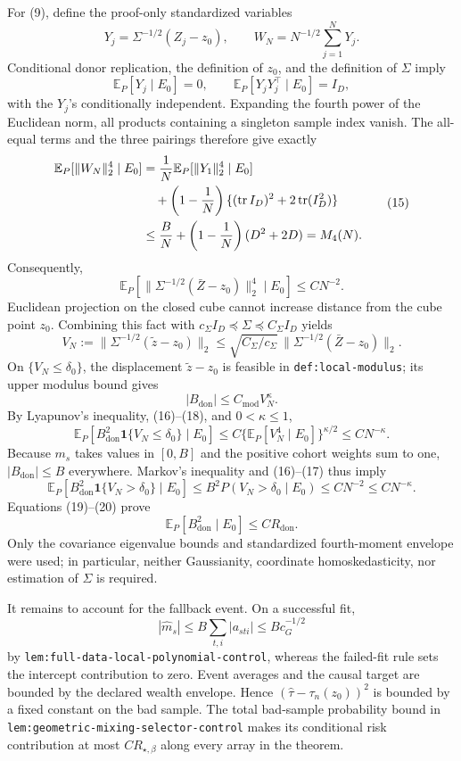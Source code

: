 For (9), define the proof-only standardized variables
\[
Y_j=\Sigma^{-1/2}(Z_j-z_0),
\qquad
W_N=N^{-1/2}\sum_{j=1}^{N}Y_j.
\]
Conditional donor replication, the definition of \(z_0\), and the definition of \(\Sigma\) imply
\[
\mathbb E_P[Y_j\mid E_0]=0,
\qquad
\mathbb E_P[Y_jY_j^\top\mid E_0]=I_D,
\]
with the \(Y_j\)'s conditionally independent.  Expanding the fourth power of the Euclidean norm, all products containing a singleton sample index vanish.  The all-equal terms and the three pairings therefore give exactly
\[
\begin{aligned}
\mathbb E_P[\|W_N\|_2^4\mid E_0]
&={1\over N}\mathbb E_P[\|Y_1\|_2^4\mid E_0]\\
&\quad+\left(1-{1\over N}\right)
\{(\operatorname{tr}I_D)^2+2\operatorname{tr}(I_D^2)\}\\
&\le {B\over N}+\left(1-{1\over N}\right)(D^2+2D)
=M_4(N).
\end{aligned}
\tag{15}
\]
Consequently,
\[
\mathbb E_P\!\left[
\|\Sigma^{-1/2}(\bar Z-z_0)\|_2^4\mid E_0
\right]
\le C N^{-2}.
\tag{16}
\]
Euclidean projection on the closed cube cannot increase distance from the cube point \(z_0\).  Combining this fact with
\(c_\Sigma I_D\preceq\Sigma\preceq C_\Sigma I_D\) yields
\[
V_N:=\|\Sigma^{-1/2}(\widetilde z-z_0)\|_2
\le \sqrt{C_\Sigma/c_\Sigma}\,
\|\Sigma^{-1/2}(\bar Z-z_0)\|_2.
\tag{17}
\]
On \(\{V_N\le\delta_0\}\), the displacement \(\widetilde z-z_0\) is feasible in \texttt{def:local-modulus}; its upper modulus bound gives
\[
|B_{\mathrm{don}}|\le C_{\mathrm{mod}}V_N^\kappa.
\tag{18}
\]
By Lyapunov's inequality, (16)--(18), and \(0<\kappa\le1\),
\[
\mathbb E_P[B_{\mathrm{don}}^2
 \mathbf1\{V_N\le\delta_0\}\mid E_0]
\le C\{\mathbb E_P[V_N^4\mid E_0]\}^{\kappa/2}
\le C N^{-\kappa}.
\tag{19}
\]
Because \(m_s\) takes values in \([0,B]\) and the positive cohort weights sum to one, \(|B_{\mathrm{don}}|\le B\) everywhere.  Markov's inequality and (16)--(17) thus imply
\[
\mathbb E_P[B_{\mathrm{don}}^2
 \mathbf1\{V_N>\delta_0\}\mid E_0]
\le B^2P(V_N>\delta_0\mid E_0)
\le C N^{-2}
\le C N^{-\kappa}.
\tag{20}
\]
Equations (19)--(20) prove
\[
\mathbb E_P[B_{\mathrm{don}}^2\mid E_0]
\le C R_{\mathrm{don}}.
\tag{21}
\]
Only the covariance eigenvalue bounds and standardized fourth-moment envelope were used; in particular, neither Gaussianity, coordinate homoskedasticity, nor estimation of \(\Sigma\) is required.

It remains to account for the fallback event.  On a successful fit,
\[
|\widehat m_s|
\le B\sum_{t,i}|a_{sti}|
\le Bc_G^{-1/2}
\tag{22}
\]
by \texttt{lem:full-data-local-polynomial-control}, whereas the failed-fit rule sets the intercept contribution to zero.  Event averages and the causal target are bounded by the declared wealth envelope.  Hence \((\widehat\tau-\tau_n(z_0))^2\) is bounded by a fixed constant on the bad sample.  The total bad-sample probability bound in \texttt{lem:geometric-mixing-selector-control} makes its conditional risk contribution at most \(CR_{\star,\beta}\) along every array in the theorem.

